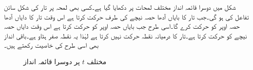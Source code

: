 شکل  میں دوسرا قائمہ انداز مختلف لمحات  پر دکھایا گیا ہے۔کسی بھی لمحہ پر تار کی شکل سائن تفاعل کی ہو گی۔جب تار کا بایاں آدھا حصہ نیچے کی طرف حرکت کرتا ہے اس وقت تار کا دایاں آدھا حصہ اوپر کو حرکت کرے گا۔اسی طرح جب بایاں حصہ اوپر کو حرکت کرتا ہے اس وقت دایاں حصہ نیچے کو حرکت کرتا ہے۔تار کا درمیانہ نقطہ حرکت نہیں کرتا ہے لہٰذا یہ نقطہ صفر ہٹاو ہے۔باقی انداز بھی اسی طرح کی خاصیت رکھتے ہیں۔
\begin{figure}
\centering
{}
\caption{مختلف $t$ پر دوسرا قائمہ انداز}
\label{شکل_جزوی_مختلف_لمحات_دوسرا_قائمہ_انداز}
\end{figure}

